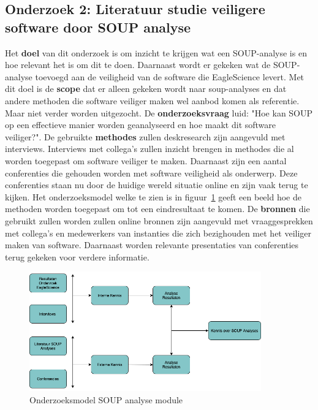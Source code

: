 \subsection{Onderzoek 2: Literatuur studie veiligere software door SOUP analyse}\label{subsec:onderzoek-literatuur-studie-soup}
Het \textbf{doel} van dit onderzoek is om inzicht te krijgen wat een SOUP-analyse is en hoe relevant het is om dit te doen. Daarnaast wordt er gekeken wat de SOUP-analyse toevoegd aan de veiligheid van de software die EagleScience levert. Met dit doel is de \textbf{scope} dat er alleen gekeken wordt naar soup-analyses en dat andere methoden die software veiliger maken wel aanbod komen als referentie. Maar niet verder worden uitgezocht.  De \textbf{onderzoeksvraag} luid: "Hoe kan SOUP op een effectieve manier worden geanalyseerd en hoe maakt dit software veiliger?". De gebruikte \textbf{methodes} zullen deskresearch zijn aangevuld met interviews. Interviews met collega's zullen inzicht brengen in methodes die al worden toegepast om software veiliger te maken. Daarnaast zijn een aantal conferenties die gehouden worden met software veiligheid als onderwerp. Deze conferenties staan nu door de huidige wereld situatie online en zijn vaak terug te kijken. Het onderzoeksmodel welke te zien is in figuur~\ref{fig:OnderzoeksModelNoodZaakSOUP} geeft een beeld hoe de methoden worden toegepast om tot een eindresultaat te komen. De \textbf{bronnen} die gebruikt zullen worden zullen online bronnen zijn aangevuld met vraaggesprekken met collega's en medewerkers van instanties die zich bezighouden met het veiliger maken van software. Daarnaast worden relevante presentaties van conferenties terug gekeken voor verdere informatie.
\begin{figure}[htbp]
    \myfloatalign
    \includegraphics[width=10cm]{gfx/OnderzoeksmodelSOUP}
    \caption{Onderzoeksmodel SOUP analyse module}
    \label{fig:OnderzoeksModelNoodZaakSOUP}
\end{figure}

